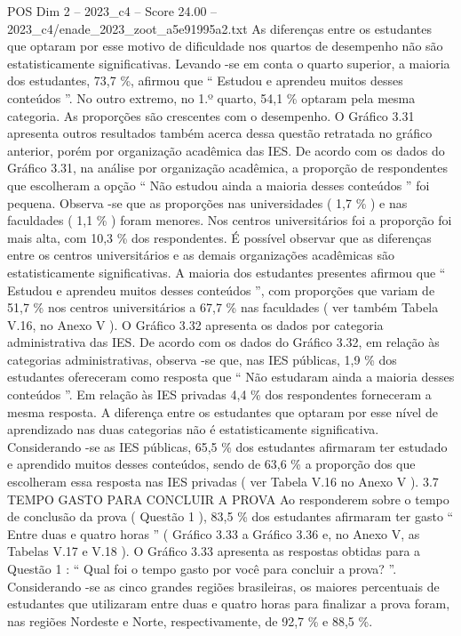 \begin{textsample}{POS Dim 2 – 2023\_c4 – Score 24.00 – 2023\_c4/enade\_2023\_zoot\_a5e91995a2.txt}
As diferenças entre os estudantes que optaram por esse motivo de dificuldade nos quartos de desempenho não são estatisticamente significativas.
Levando -se em conta o quarto superior, a maioria dos estudantes, 73,7 \%, afirmou que “ Estudou e aprendeu muitos desses conteúdos ”.
No outro extremo, no 1.º quarto, 54,1 \% optaram pela mesma categoria.
As proporções são crescentes com o desempenho.
O Gráfico 3.31 apresenta outros resultados também acerca dessa questão retratada no gráfico anterior, porém por organização acadêmica das IES.
De acordo com os dados do Gráfico 3.31, na análise por organização acadêmica, a proporção de respondentes que escolheram a opção “ Não estudou ainda a maioria desses conteúdos ” foi pequena.
Observa -se que as proporções nas universidades ( 1,7 \% ) e nas faculdades ( 1,1 \% ) foram menores.
Nos centros universitários foi a proporção foi mais alta, com 10,3 \% dos respondentes.
É possível observar que as diferenças entre os centros universitários e as demais organizações acadêmicas são estatisticamente significativas.
A maioria dos estudantes presentes afirmou que “ Estudou e aprendeu muitos desses conteúdos ”, com proporções que variam de 51,7 \% nos centros universitários a 67,7 \% nas faculdades ( ver também Tabela V.16, no Anexo V ).
O Gráfico 3.32 apresenta os dados por categoria administrativa das IES.
De acordo com os dados do Gráfico 3.32, em relação às categorias administrativas, observa -se que, nas IES públicas, 1,9 \% dos estudantes ofereceram como resposta que “ Não estudaram ainda a maioria desses conteúdos ”.
Em relação às IES privadas 4,4 \% dos respondentes forneceram a mesma resposta.
A diferença entre os estudantes que optaram por esse nível de aprendizado nas duas categorias não é estatisticamente significativa.
Considerando -se as IES públicas, 65,5 \% dos estudantes afirmaram ter estudado e aprendido muitos desses conteúdos, sendo de 63,6 \% a proporção dos que escolheram essa resposta nas IES privadas ( ver Tabela V.16 no Anexo V ). 3.7 TEMPO GASTO PARA CONCLUIR A PROVA Ao responderem sobre o tempo de conclusão da prova ( Questão 1 ), 83,5 \% dos estudantes afirmaram ter gasto “ Entre duas e quatro horas ” ( Gráfico 3.33 a Gráfico 3.36 e, no Anexo V, as Tabelas V.17 e V.18 ).
O Gráfico 3.33 apresenta as respostas obtidas para a Questão 1 : “ Qual foi o tempo gasto por você para concluir a prova? ”.
Considerando -se as cinco grandes regiões brasileiras, os maiores percentuais de estudantes que utilizaram entre duas e quatro horas para finalizar a prova foram, nas regiões Nordeste e Norte, respectivamente, de 92,7 \% e 88,5 \%.

\end{textsample}
